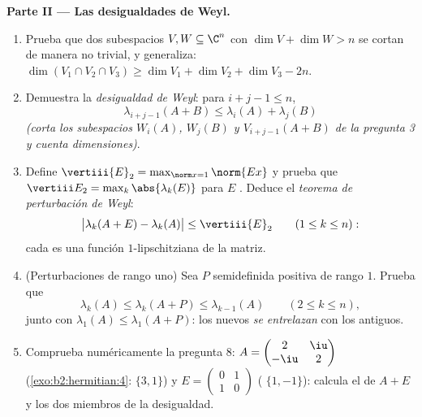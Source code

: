 \begin{problem}
\medskip
\noindent\textbf{Parte II --- Las desigualdades de Weyl.}
\begin{enumerate}[resume]
  \item Prueba que dos subespacios $V, W \subseteq \C^n$ con $\dim V
        + \dim W > n$ se cortan de manera no trivial, y generaliza:
        $\dim(V_1 \cap V_2 \cap V_3) \geq \dim V_1 + \dim V_2 + \dim
        V_3 - 2n$.
  \item Demuestra la \emph{desigualdad de Weyl}: para $i + j - 1
        \leq n$,
        \[
        \lambda_{i+j-1}(A + B) \leq \lambda_i(A) +
        \lambda_j(B)
        \]
        \emph{(corta los subespacios $W_i(A)$, $W_j(B)$ y
        $V_{i+j-1}(A+B)$ de la pregunta 3 y cuenta dimensiones)}.
  \item Define $\vertiii{E}_2 = \max_{\norm x = 1}\norm{Ex}$ y
        prueba que $\vertiii E_2 = \max_k\abs{\lambda_k(E)}$ para
        $E$ . Deduce el \emph{teorema de perturbación de
        Weyl}:
        \[
        \bigl|\lambda_k(A + E) - \lambda_k(A)\bigr| \leq
        \vertiii{E}_2
        \qquad (1 \leq k \leq n) :
        \]
        cada  es una función $1$-lipschitziana de la
        matriz.
  \item (Perturbaciones de rango uno) Sea $P$ 
        semidefinida positiva de rango $1$. Prueba que
        \[
        \lambda_k(A) \leq \lambda_k(A + P) \leq
        \lambda_{k-1}(A) \qquad (2 \leq k \leq n),
        \]
        junto con $\lambda_1(A) \leq \lambda_1(A+P)$: los nuevos
         \emph{se entrelazan} con los antiguos.
  \item Comprueba numéricamente la pregunta 8: $A = \begin{pmatrix}
        2 & \iu\\ -\iu & 2\end{pmatrix}$
        (\cref{exo:b2:hermitian:4}:  $\{3, 1\}$) y $E =
        \begin{pmatrix} 0 & 1\\ 1 & 0\end{pmatrix}$ (
        $\{1, -1\}$): calcula el  de $A + E$ y los dos
        miembros de la desigualdad.
\end{enumerate}


\end{problem}

